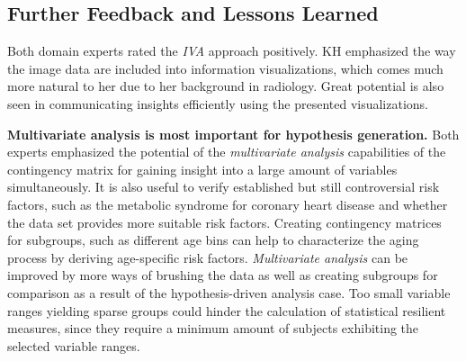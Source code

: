 \documentclass[journal]{style/vgtc} 			          %
\newcommand{\com}[1]{\textcolor{orange}{\uline{#1}}}
\begin{document}

\subsection{Further Feedback and Lessons Learned} \label{Lessons Learned}
%
Both domain experts rated the \emph{IVA} approach positively. %
%
KH emphasized the way the image data are included into information visualizations, which comes much more natural to her due to her background in radiology.
%
%
Great potential is also seen in communicating insights efficiently using the presented visualizations.

\textbf{Multivariate analysis is most important for hypothesis generation.}
Both experts emphasized the potential of the \emph{multivariate analysis} capabilities of the contingency matrix for gaining insight into a large amount of variables simultaneously.
%
It is also useful to verify established but still controversial risk factors, such as the metabolic syndrome for coronary heart disease and whether the data set provides more suitable risk factors.
%
Creating contingency matrices for subgroups, such as different age bins can help to characterize the aging process by deriving age-specific risk factors.
%
\emph{Multivariate analysis} can be improved by more ways of brushing the data as well as creating subgroups for comparison as a result of the hypothesis-driven analysis case.
%
Too small variable ranges yielding sparse groups could hinder the calculation of statistical resilient measures, since they require a minimum amount of subjects exhibiting the selected variable ranges.
%
\end{document}
